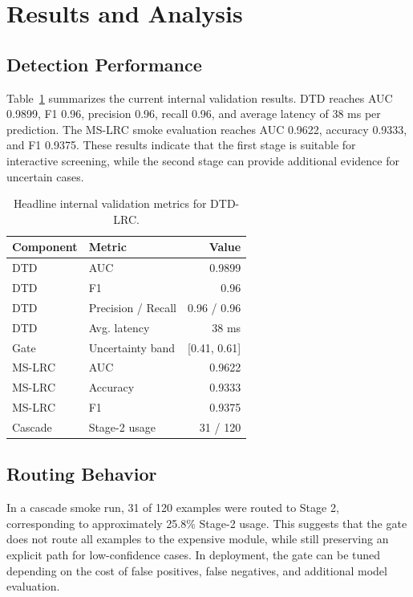 \documentclass[11pt]{article}
\begin{document}
\section{Results and Analysis}

\subsection{Detection Performance}

Table~\ref{tab:metrics} summarizes the current internal validation results. DTD reaches AUC 0.9899, F1 0.96, precision 0.96, recall 0.96, and average latency of 38 ms per prediction. The MS-LRC smoke evaluation reaches AUC 0.9622, accuracy 0.9333, and F1 0.9375. These results indicate that the first stage is suitable for interactive screening, while the second stage can provide additional evidence for uncertain cases.

\begin{table}[t]
\centering
\small
\begin{tabular}{llr}
\toprule
Component & Metric & Value \\
\midrule
DTD & AUC & 0.9899 \\
DTD & F1 & 0.96 \\
DTD & Precision / Recall & 0.96 / 0.96 \\
DTD & Avg. latency & 38 ms \\
Gate & Uncertainty band & [0.41, 0.61] \\
MS-LRC & AUC & 0.9622 \\
MS-LRC & Accuracy & 0.9333 \\
MS-LRC & F1 & 0.9375 \\
Cascade & Stage-2 usage & 31 / 120 \\
\bottomrule
\end{tabular}
\caption{Headline internal validation metrics for DTD-LRC.}
\label{tab:metrics}
\end{table}

\subsection{Routing Behavior}

In a cascade smoke run, 31 of 120 examples were routed to Stage 2, corresponding to approximately 25.8\% Stage-2 usage. This suggests that the gate does not route all examples to the expensive module, while still preserving an explicit path for low-confidence cases. In deployment, the gate can be tuned depending on the cost of false positives, false negatives, and additional model evaluation.
\end{document}
